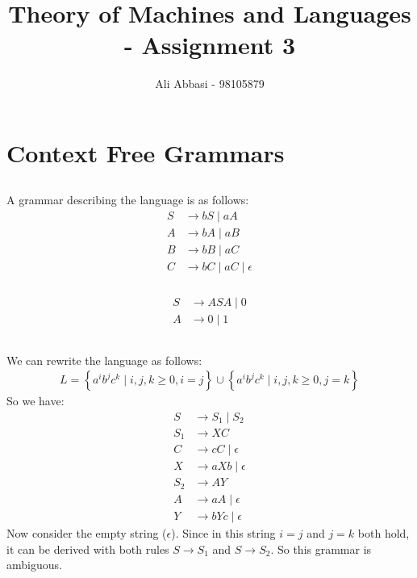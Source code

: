 \documentclass{article}
\title{Theory of Machines and Languages - Assignment 3}
\author{Ali Abbasi - 98105879}
\numberwithin{equation}{subsection}
\begin{document}
\maketitle
\tableofcontents
\pagebreak

\section{Context Free Grammars}
\subsection{}
\subsubsection{}
A grammar describing the language is as follows:
\begin{align*}
S &\rightarrow bS \mid aA\\
A &\rightarrow bA \mid aB\\
B &\rightarrow bB \mid aC\\
C &\rightarrow bC \mid aC \mid \epsilon
\end{align*}

\subsubsection{}
\begin{align*}
S &\rightarrow ASA \mid 0\\
A &\rightarrow 0 \mid 1
\end{align*}

\subsection{}
We can rewrite the language as follows:
\begin{gather}
L=\left\{a^ib^jc^k \mid i, j, k \ge 0, i=j\right\} \cup 
\left\{a^ib^jc^k \mid i, j, k \ge 0, j=k\right\}
\end{gather}
So we have:
\begin{align*}
S &\rightarrow S_1 \mid S_2\\
S_1 &\rightarrow XC\\
C &\rightarrow cC \mid \epsilon\\
X &\rightarrow a X b \mid \epsilon\\
S_2 &\rightarrow AY\\
A &\rightarrow aA \mid \epsilon\\
Y &\rightarrow bYc \mid \epsilon
\end{align*}
Now consider the empty string (\(\epsilon\)).
Since in this string \(i=j\) and \(j=k\) both hold, it can be derived with both rules \(S\rightarrow S_1\) and \(S\rightarrow S_2\).
So this grammar is ambiguous.
\end{document}
